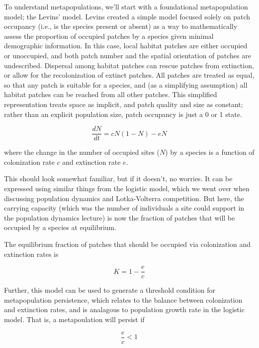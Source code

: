 \documentclass[12pt]{article}
\begin{document}
To understand metapopulations, we'll start with a foundational metapopulation model; the Levins' model. Levins created a simple model focused solely on patch occupancy (i.e., is the species present or absent) as a way to mathematically assess the proportion of occupied patches by a species given minimal demographic information. In this case, local habitat patches are either occupied or unoccupied, and both patch number and the spatial orientation of patches are undescribed. Dispersal among habitat patches can rescue patches from extinction, or allow for the recolonization of extinct patches. All patches are treated as equal, so that any patch is suitable for a species, and (as a simplifying assumption) all habitat patches can be reached from all other patches. This simplified representation treats space as implicit, and patch quality and size as constant; rather than an explicit population size, patch occupancy is just a 0 or 1 state.


\begin{equation}
\frac{dN}{dt} = cN(1-N) - eN
\end{equation}

where the change in the number of occupied sites ($N$) by a species is a function of colonization rate $c$ and extinction rate $e$. 


This should look somewhat familiar, but if it doesn't, no worries. It can be expressed using similar things from the logistic model, which we went over when discussing population dynamics and Lotka-Volterra competition. But here, the carrying capacity (which was the number of individuals a site could support in the population dynamics lecture) is now the fraction of patches that will be occupied by a species at equilibrium. 

The equilibrium fraction of patches that should be occupied via colonization and extinction rates is 

\begin{equation}
K = 1 - \frac{e}{c}
\end{equation}

Further, this model can be used to generate a threshold condition for metapopulation persistence, which relates to the balance between colonization and extinction rates, and is analagous to population growth rate in the logistic model. That is, a metapoulation will persist if 


\begin{equation}
  \frac{e}{c} < 1 
\end{equation}
\end{document}
